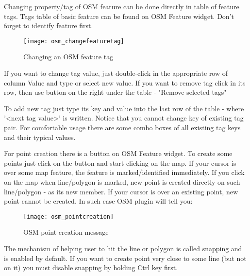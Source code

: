 
Changing property/tag of OSM feature can be done directly in table of feature
tags. Tags table of basic feature can be found on OSM Feature widget. Don't
forget to identify feature first.

\begin{figure}[ht]
   \begin{center}
   \caption{Changing an OSM feature tag \nixcaption}\label{fig:osmchfeattag}\smallskip
   \texttt{[image: osm\_changefeaturetag]}
\end{center}
\end{figure}

If you want to change tag value, just double-click in the appropriate row of
column Value and type or select new value. If you want to remove tag click in
its row, then use button on the right under the table - "Remove selected
tags"

To add new tag just type its key and value into the last row of the table -
where '<next tag value>' is written. Notice that you cannot change key of
existing tag pair. For comfortable usage there are some combo boxes of all
existing tag keys and their typical values.


For point creation there is a  
button on OSM Feature widget. To create some points just click on the 
button and start clicking on the map. If your cursor is over some map 
feature, the feature is marked/identified immediately. If you click on 
the map when line/polygon is marked, new point is created directly on 
such line/polygon - as its new member. If your cursor is over an existing 
point, new point cannot be created. In such case OSM plugin will tell you:

\begin{figure}[ht]
   \begin{center}
   \caption{OSM point creation message \nixcaption}\label{fig:osmpoicreat}\smallskip
   \texttt{[image: osm\_pointcreation]}
\end{center}
\end{figure}

The mechanism of helping user to hit the line or polygon is called snapping
and is enabled by default. If you want to create point very close to some
line (but not on it) you must disable snapping by holding Ctrl key first.


